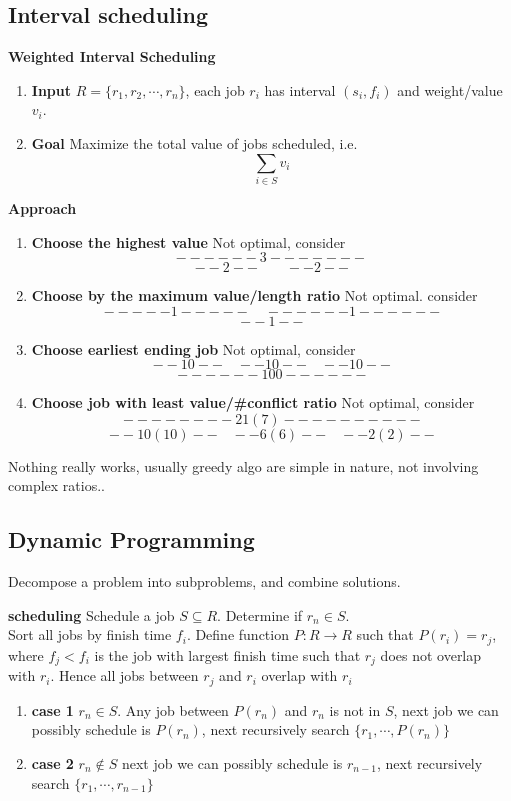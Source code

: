 \documentclass[11pt]{article}
\begin{document}
\subsection*{Interval scheduling}

\textbf{Weighted Interval Scheduling}
\begin{enumerate}
  \item \textbf{Input} $R = \{ r_1, r_2, \cdots, r_n \}$, each job $r_i$ has interval $(s_i, f_i)$ and weight/value $v_i$.
  \item \textbf{Goal} Maximize the total value of jobs scheduled, i.e.
  \[
    \sum_{i\in S} v_i
  \]
\end{enumerate}

\textbf{Approach}
\begin{enumerate}
  \item \textbf{Choose the highest value}  Not optimal, consider
  \[
    ------3-------
  \]
  \[
    --2-- \quad\quad --2--
  \]
  \item \textbf{Choose by the maximum value/length ratio} Not optimal. consider
  \[
     -----1----- \quad ------1------
  \]
  \[
              --1--
  \]
  \item \textbf{Choose earliest ending job} Not optimal, consider
  \[
    --10-- \quad --10--\quad --10--
  \]
  \[
    ------100------
  \]
  \item \textbf{Choose job with least value/\#conflict ratio} Not optimal, consider
  \[
    --------21 (7)----------
  \]
  \[
    --10(10)-- \quad --6(6)-- \quad --2(2)--
  \]
\end{enumerate}
Nothing really works, usually greedy algo are simple in nature, not involving complex ratios..


\subsection*{Dynamic Programming}
Decompose a problem into subproblems, and combine solutions.

\begin{example}
  \textbf{scheduling} Schedule a job $S\subseteq R$. Determine if $r_n \in S$. \\
  Sort all jobs by finish time $f_i$. Define function $P: R \to R$ such that $P(r_i) = r_j$, where $f_j < f_i$ is the job with largest finish time such that $r_j$ does not overlap with $r_i$. Hence all jobs between $r_j$ and $r_i$ overlap with $r_i$
  \begin{enumerate}
    \item \textbf{case 1} $r_n\in S$. Any job between $P(r_n)$ and $r_n$ is not in $S$, next job we can possibly schedule is $P(r_n)$, next recursively search $\{ r_1, \cdots, P(r_n)\}$

    \item \textbf{case 2} $r_n\not\in S$ next job we can possibly schedule is $r_{n-1}$, next recursively search $\{ r_1, \cdots, r_{n-1}\}$
  \end{enumerate}
\end{example}
\end{document}

